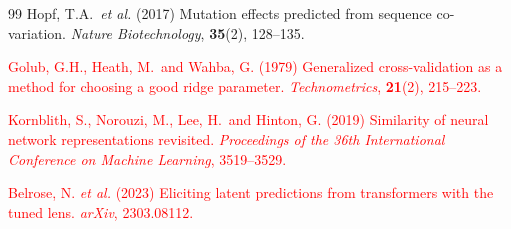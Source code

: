 \documentclass[11pt,a4paper]{article}
\newcommand{\revised}[1]{\textcolor{red}{#1}}
\begin{document}
\begin{thebibliography}{99}
Hopf, T.A.\ \textit{et al.} (2017)
Mutation effects predicted from sequence co-variation.
\textit{Nature Biotechnology}, \textbf{35}(2), 128--135.

\revised{Golub, G.H., Heath, M.\ and Wahba, G. (1979)
Generalized cross-validation as a method for choosing a good ridge parameter.
\textit{Technometrics}, \textbf{21}(2), 215--223.}

\revised{Kornblith, S., Norouzi, M., Lee, H.\ and Hinton, G. (2019)
Similarity of neural network representations revisited.
\textit{Proceedings of the 36th International Conference on Machine Learning},
3519--3529.}

\revised{Belrose, N. \textit{et al.} (2023)
Eliciting latent predictions from transformers with the tuned lens.
\textit{arXiv}, 2303.08112.}

\end{thebibliography}
\end{document}
